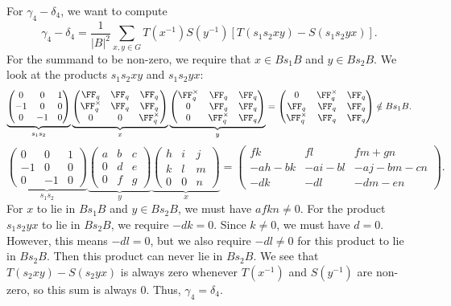 \documentclass[11pt]{amsart}
\theoremstyle{remark}
\begin{document}
For $\gamma_4-\delta_4$, we want to compute
\[
	\gamma_4-\delta_4 = \frac{1}{|B|^2}\sum_{x,y\in G} T(x^{-1})S(y^{-1})[T(s_1s_2xy)-S(s_1s_2yx)].
\]
For the summand to be non-zero, we require that $x\in Bs_1B$ and $y\in Bs_2B$.
We look at the products $s_1s_2xy$ and $s_1s_2yx$:
\[
	\underbrace{\begin{pmatrix}
			0  & 0  & 1 \\
			-1 & 0  & 0 \\
			0  & -1 & 0
		\end{pmatrix}}_{s_1s_2}
	\underbrace{\begin{pmatrix}
			\FF_q        & \FF_q & \FF_q        \\
			\FF_q^\times & \FF_q & \FF_q        \\
			0            & 0     & \FF_q^\times
		\end{pmatrix}}_{x}
	\underbrace{\begin{pmatrix}
			\FF_q^\times & \FF_q        & \FF_q \\
			0            & \FF_q        & \FF_q \\
			0            & \FF_q^\times & \FF_q
		\end{pmatrix}}_{y} =
	\begin{pmatrix}
		0            & \FF_q^\times & \FF_q \\
		\FF_q        & \FF_q        & \FF_q \\
		\FF_q^\times & \FF_q        & \FF_q
	\end{pmatrix}\notin Bs_1B.
\]
\[
	\underbrace{\begin{pmatrix}
			0  & 0  & 1 \\
			-1 & 0  & 0 \\
			0  & -1 & 0
		\end{pmatrix}}_{s_1s_2}
	\underbrace{\begin{pmatrix}
			a & b & c \\
			0 & d & e \\
			0 & f & g
		\end{pmatrix}}_{y}
	\underbrace{\begin{pmatrix}
			h & i & j \\
			k & l & m \\
			0 & 0 & n
		\end{pmatrix}}_{x} =
	\begin{pmatrix}
		fk     & fl     & fm+gn     \\
		-ah-bk & -ai-bl & -aj-bm-cn \\
		-dk    & -dl    & -dm-en
	\end{pmatrix}.
\]
For $x$ to lie in $Bs_1B$ and $y\in Bs_2B$, we must have $afkn\neq 0$.
For the product $s_1s_2yx$ to lie in $Bs_2B$, we require $-dk=0$.
Since $k\neq 0$, we must have $d=0$.
However, this means $-dl=0$, but we also require $-dl\neq 0$ for this product to lie in $Bs_2B$.
Then this product can never lie in $Bs_2B$.
We see that $T(s_2xy)-S(s_2yx)$ is always zero whenever $T(x^{-1})$ and $S(y^{-1})$ are non-zero, so this sum is always $0$.
Thus, $\gamma_4 =\delta_4$.
\end{document}
